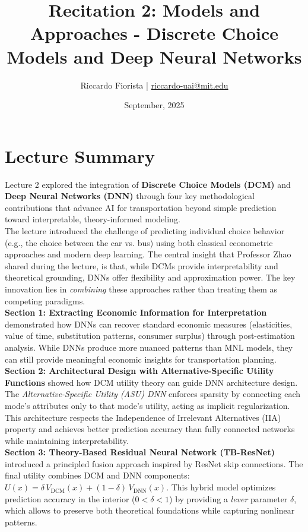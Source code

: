 \documentclass[11pt]{article}
\title{Recitation 2: Models and Approaches - Discrete Choice Models and Deep Neural Networks}
\author{Riccardo Fiorista | \href{mailto:riccardo-uai@mit.edu}{riccardo-uai@mit.edu}}
\date{September, 2025}
\begin{document}
\maketitle
\thispagestyle{fancy} %

\section*{Lecture Summary}

Lecture 2 explored the integration of \textbf{Discrete Choice Models (DCM)} and \textbf{Deep Neural Networks (DNN)} through four key methodological contributions that advance AI for transportation beyond simple prediction toward interpretable, theory-informed modeling.\\

The lecture introduced the challenge of predicting individual choice behavior (e.g., the choice between the car vs. bus) using both classical econometric approaches and modern deep learning. The central insight that Professor Zhao shared during the lecture, is that, while DCMs provide interpretability and theoretical grounding, DNNs offer flexibility and approximation power. The key innovation lies in \textit{combining} these approaches rather than treating them as competing paradigms.\\

\textbf{Section 1: Extracting Economic Information for Interpretation} demonstrated how DNNs can recover standard economic measures (elasticities, value of time, substitution patterns, consumer surplus) through post-estimation analysis. While DNNs produce more nuanced patterns than MNL models, they can still provide meaningful economic insights for transportation planning.\\

\textbf{Section 2: Architectural Design with Alternative-Specific Utility Functions} showed how DCM utility theory can guide DNN architecture design. The \textit{Alternative-Specific Utility (ASU) DNN} enforces sparsity by connecting each mode's attributes only to that mode's utility, acting as implicit regularization. This architecture respects the Independence of Irrelevant Alternatives (IIA) property and achieves better prediction accuracy than fully connected networks while maintaining interpretability.\\

\textbf{Section 3: Theory-Based Residual Neural Network (TB-ResNet)} introduced a principled fusion approach inspired by ResNet skip connections. The final utility combines DCM and DNN components: $U(x) = \delta \, V_{\text{DCM}}(x) + (1-\delta) \, V_{\text{DNN}}(x)$. This hybrid model optimizes prediction accuracy in the interior ($0 < \delta < 1$) by providing a \textit{lever} parameter $\delta$, which allows to preserve both theoretical foundations while capturing nonlinear patterns.\\
\end{document}
